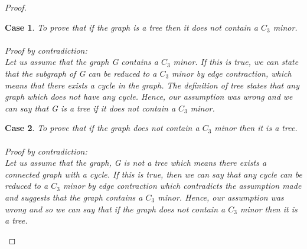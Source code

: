 \documentclass{article}
\newtheorem{case}{Case}
\begin{document}
\begin{proof}
    \begin{case}
To prove that if the graph is a tree then it does not contain a $C_3$ minor.\\
\\
Proof by contradiction: \\
Let us assume that the graph G contains a $C_3$ minor. If this is true, we can state that the subgraph of G can be reduced to a $C_3$ minor by edge contraction, which means that there exists a cycle in the graph. The definition of tree states that any graph which does not have any cycle. Hence, our assumption was wrong and we can say that G is a tree if it does not contain a $C_3$ minor.  \\
    \end{case}

    \begin{case}
To prove that if the graph does not contain a $C_3$ minor then it is a tree.\\
\\Proof by contradiction: 
\\
Let us assume that the graph, G is not a tree which means there exists a connected graph with a cycle. If this is true, then we can say that any cycle can be reduced to a $C_3$ minor by edge contraction which contradicts the assumption made and suggests that the graph contains a $C_3$ minor. Hence, our assumption was wrong and so we can say that if the graph does not contain a $C_3$ minor then it is a tree.   


\begin{center}
    

\end{center}
\end{case}
\end{proof}
\end{document}
